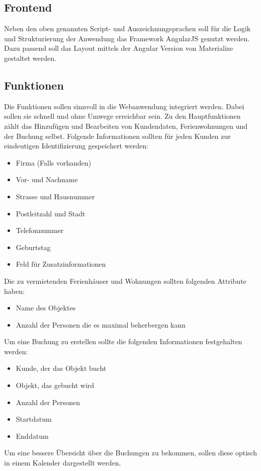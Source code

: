 \subsection{Frontend}
Neben den oben genannten Script- und Auszeichnungsprachen soll für die Logik und Strukturierung der Anwendung das Framework AngularJS genutzt werden. Dazu passend soll das Layout mittels der Angular Version von Materialize gestaltet werden. 

\subsection{Funktionen}
Die Funktionen sollen sinnvoll in die Webanwendung integriert werden. Dabei sollen sie schnell und ohne Umwege erreichbar sein. Zu den Hauptfunktionen zählt das Hinzufügen und Bearbeiten von Kundendaten, Ferienwohnungen und der Buchung selbst. 
Folgende Informationen sollten für jeden Kunden zur eindeutigen Identifizierung gespeichert werden:
\begin{itemize} 
\item Firma (Falls vorhanden)
\item Vor- und Nachname
\item Strasse und Hausnummer
\item Postleitzahl und Stadt
\item Telefonnummer
\item Geburtstag 
\item Feld für Zusatzinformationen
\end{itemize}

Die zu vermietenden Ferienhäuser und Wohnungen sollten folgenden Attribute haben:
\begin{itemize} 
\item Name des Objektes
\item Anzahl der Personen die es maximal beherbergen kann
\end{itemize}

Um eine Buchung zu erstellen sollte die folgenden Informationen festgehalten werden:
\begin{itemize} 
\item Kunde, der das Objekt bucht
\item Objekt, das gebucht wird
\item Anzahl der Personen
\item Startdatum
\item Enddatum
\end{itemize}

Um eine bessere Übersicht über die Buchungen zu bekommen, sollen diese optisch in einem Kalender dargestellt werden.
